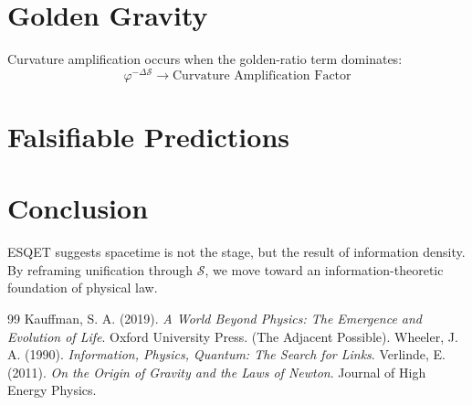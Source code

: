 \documentclass[11pt,a4paper]{article}
\begin{document}
\section{Golden Gravity}
Curvature amplification occurs when the golden-ratio term dominates:
\[ \varphi^{-\Delta\mathcal{S}} \rightarrow \text{Curvature Amplification Factor} \]

\section{Falsifiable Predictions}

\section{Conclusion}
ESQET suggests spacetime is not the stage, but the result of information density. By reframing unification through $$, we move toward an information-theoretic foundation of physical law.

\begin{thebibliography}{99}
 Kauffman, S. A. (2019). \textit{A World Beyond Physics: The Emergence and Evolution of Life}. Oxford University Press. (The Adjacent Possible).
 Wheeler, J. A. (1990). \textit{Information, Physics, Quantum: The Search for Links}.
 Verlinde, E. (2011). \textit{On the Origin of Gravity and the Laws of Newton}. Journal of High Energy Physics.
\end{thebibliography}
\end{document}
